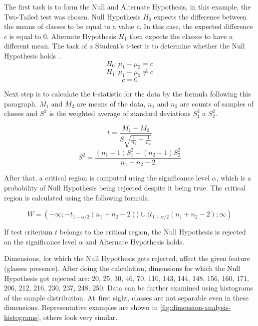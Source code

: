 The first task is to form the Null and Alternate Hypothesis, in this example, the Two-Tailed test was chosen. Null Hypothesis $H_0$ expects the difference between the means of classes to be equal to a value $c$. In this case, the expected difference $c$ is equal to 0. Alternate Hypothesis $H_1$ then expects the classes to have a different mean. The task of a Student's t-test is to determine whether the Null Hypothesis holds \cite{encyclopediaOfMathematics}.
$$ H_0: \mu_1 - \mu_2 = c $$
$$ H_1: \mu_1 - \mu_2 \neq c $$
$$ c = 0$$

Next step is to calculate the t-statistic for the data by the formula following this paragraph. $M_1$ and $M_2$ are means of the data, $n_1$ and $n_2$ are counts of samples of classes and $S^2$ is the weighted average of standard deviations $S_1^2$ a $S_2^2$.

$$ t=\frac{M_1-M_2}{S\sqrt{\frac{1}{n_1}+\frac{1}{n_2}}} $$
$$ S^2 = \frac{(n_1-1)S_1^2 + (n_2-1)S_2^2}{n_1 + n_2 - 2} $$

After that, a critical region is computed using the significance level $\alpha$, which is a probability of Null Hypothesis being rejected despite it being true. The critical region is calculated using the following formula.

$$ W = (-\infty; -t_{1-\alpha/2}(n_1 + n_2 - 2) \rangle \cup \langle t_{1-\alpha/2}(n_1 + n_2 - 2); \infty) $$

\noindent If test criterium $t$ belongs to the critical region, the Null Hypothesis is rejected on the significance level $\alpha$ and Alternate Hypothesis holds.

Dimensions, for which the Null Hypothesis gets rejected, affect the given feature (glasses presence). After doing the calculation, dimensions for which the Null Hypothesis got rejected are: 20, 25, 30, 46, 70, 110, 143, 144, 148, 156, 160, 171, 206, 212, 216, 230, 237, 248, 250. Data can be further examined using histograms of the sample distribution. At~first sight, classes are not separable even in these dimensions. Representative examples are shown in \autoref{fig:dimension-analysis-histograms}, others look very similar.

